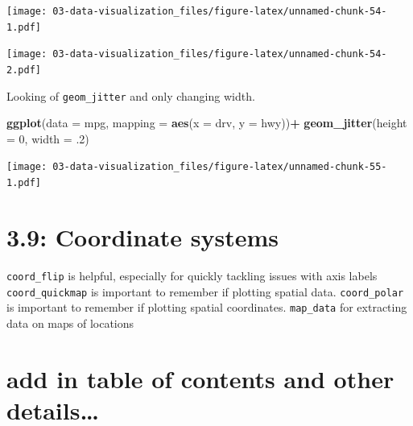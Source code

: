 \documentclass[]{book}
\newenvironment{Shaded}{\begin{snugshade}}{\end{snugshade}}
\newcommand{\DataTypeTok}[1]{\textcolor[rgb]{0.13,0.29,0.53}{#1}}
\newcommand{\DecValTok}[1]{\textcolor[rgb]{0.00,0.00,0.81}{#1}}
\newcommand{\FloatTok}[1]{\textcolor[rgb]{0.00,0.00,0.81}{#1}}
\newcommand{\KeywordTok}[1]{\textcolor[rgb]{0.13,0.29,0.53}{\textbf{#1}}}
\newcommand{\NormalTok}[1]{#1}
\newcommand{\OperatorTok}[1]{\textcolor[rgb]{0.81,0.36,0.00}{\textbf{#1}}}
\newcommand{\StringTok}[1]{\textcolor[rgb]{0.31,0.60,0.02}{#1}}
\theoremstyle{definition}
\theoremstyle{definition}
\theoremstyle{definition}
\theoremstyle{remark}
\begin{document}
\texttt{[image: 03-data-visualization\_files/figure-latex/unnamed-chunk-54-1.pdf]}

\begin{Shaded}
\end{Shaded}

\texttt{[image: 03-data-visualization\_files/figure-latex/unnamed-chunk-54-2.pdf]}

Looking of \texttt{geom\_jitter} and only changing width.

\begin{Shaded}
\begin{Highlighting}[]
\KeywordTok{ggplot}\NormalTok{(}\DataTypeTok{data =}\NormalTok{ mpg, }\DataTypeTok{mapping =} \KeywordTok{aes}\NormalTok{(}\DataTypeTok{x =}\NormalTok{ drv, }\DataTypeTok{y =}\NormalTok{ hwy))}\OperatorTok{+}
\StringTok{  }\KeywordTok{geom_jitter}\NormalTok{(}\DataTypeTok{height =} \DecValTok{0}\NormalTok{, }\DataTypeTok{width =} \FloatTok{.2}\NormalTok{)}
\end{Highlighting}
\end{Shaded}

\texttt{[image: 03-data-visualization\_files/figure-latex/unnamed-chunk-55-1.pdf]}

\hypertarget{coordinate-systems-1}{%
\section{3.9: Coordinate systems}\label{coordinate-systems-1}}

\texttt{coord\_flip} is helpful, especially for quickly tackling issues
with axis labels \texttt{coord\_quickmap} is important to remember if
plotting spatial data. \texttt{coord\_polar} is important to remember if
plotting spatial coordinates. \texttt{map\_data} for extracting data on
maps of locations

\hypertarget{add-in-table-of-contents-and-other-details}{%
\section{add in table of contents and other
details\ldots{}}\label{add-in-table-of-contents-and-other-details}}
\end{document}

